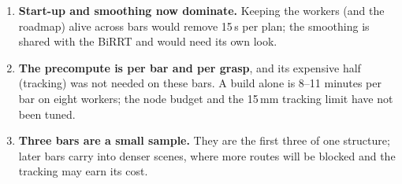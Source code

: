 \begin{enumerate}[nosep,label=(\roman*)]
        and 0.078\,mm of a BiRRT path (Table~\ref{tab:robarchdense}); the 2\,mm cut
        is for the collision check. The roadmap paths are monotone joint by joint,
        the BiRRT's searched paths are not.
  \item \textbf{Start-up and smoothing now dominate.} Keeping the workers (and the
        roadmap) alive across bars would remove 15\,s per plan; the smoothing is
        shared with the BiRRT and would need its own look.
  \item \textbf{The precompute is per bar and per grasp}, and its expensive half
        (tracking) was not needed on these bars. A build alone is 8--11 minutes per
        bar on eight workers; the node budget and the 15\,mm tracking limit have not
        been tuned.
  \item \textbf{Three bars are a small sample.} They are the first three of one
        structure; later bars carry into denser scenes, where more routes will be
        blocked and the tracking may earn its cost.
\end{enumerate}
